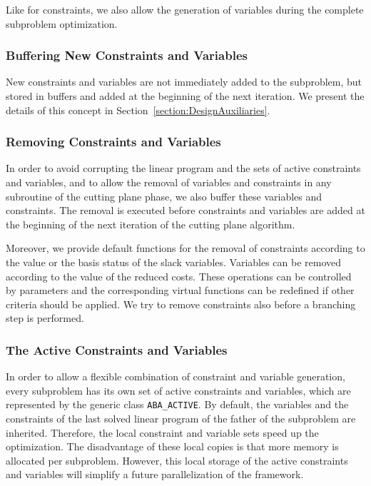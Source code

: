 Like for constraints, we also allow the generation of variables
during the complete subproblem optimization.

\subsubsection{Buffering New Constraints and Variables}

New constraints and variables are not immediately added to the subproblem,
but stored in buffers and added at the beginning of the next iteration.
We present the details of this concept in 
Section~\ref{section:DesignAuxiliaries}.

\subsubsection{Removing Constraints and Variables}

In order to avoid corrupting the linear program and the sets of active
constraints and variables, and to allow the removal of variables and
constraints in any subroutine of the cutting plane phase, we also buffer
these variables and constraints. The removal is executed before constraints
and variables are added at the beginning of the next iteration of the
cutting plane algorithm.

Moreover, we provide default functions for the removal of constraints
according to the value or the basis status of the slack 
variables. Variables can be removed according to the value of the
reduced costs. These operations can be controlled by parameters
and the corresponding virtual functions can be redefined if other criteria
should be applied. We try to remove constraints also before a branching
step is performed.

\subsubsection{The Active Constraints and Variables}

In order to allow a flexible combination of constraint and variable
generation, every subproblem has its own set of active constraints and 
variables, which are represented by the generic 
class {\tt ABA\_ACTIVE}. 
By default, the variables and the constraints of the last
solved linear program of the father of the subproblem are inherited.
Therefore, the local constraint and variable sets speed up
the optimization.
The disadvantage of these local copies is that more memory is allocated
per subproblem.
However, this local storage of the active constraints and variables will 
simplify a future parallelization of the framework.

